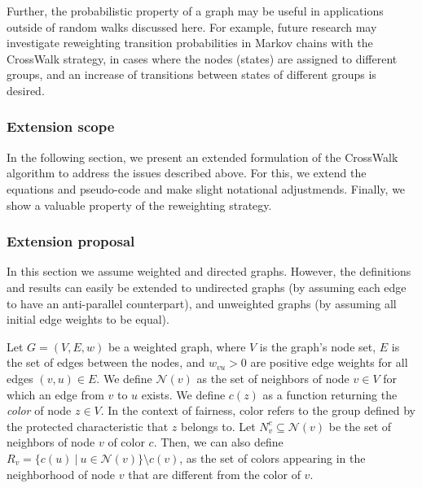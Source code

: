 Further, the probabilistic property of a graph may be useful in applications outside of random walks discussed here.  For example, future research may investigate reweighting transition probabilities in Markov chains with the CrossWalk strategy, in cases where the nodes (states) are assigned to different groups, and an increase of transitions between states of different groups is desired.


\subsubsection*{Extension scope}
In the following section, we present an extended formulation of the CrossWalk algorithm to address the issues described above. For this, we extend the equations and pseudo-code and make slight notational adjustmends. Finally, we show a valuable property of the reweighting strategy.

\subsubsection*{Extension proposal}

In this section we assume weighted and directed graphs. However, the definitions and results can easily be extended to undirected graphs (by assuming each edge to have an anti-parallel counterpart), and unweighted graphs (by assuming all initial edge weights to be equal).

Let $G = (V, E, w)$ be a weighted graph, where $V$ is the graph's node set, $E$ is the set of edges between the nodes, and $w_{vu} > 0$ are positive edge weights for all edges $(v, u) \in E$. We define $\mathcal{N}(v)$ as the set of neighbors of node $v \in V$ for which an edge from $v$ to $u$ exists. We define $c(z)$ as a function returning the \textit{color} of node $z \in V$. In the context of fairness, color refers to the group defined by the protected characteristic that $z$ belongs to. Let $N_v^c \subseteq \mathcal{N}(v)$ be the set of neighbors of node $v$ of color $c$. Then, we can also define $R_v = \{ c(u) \ | \ u \in \mathcal{N}(v) \} \setminus c(v)$, as the set of colors appearing in the neighborhood of node $v$ that are different from the color of $v$.

